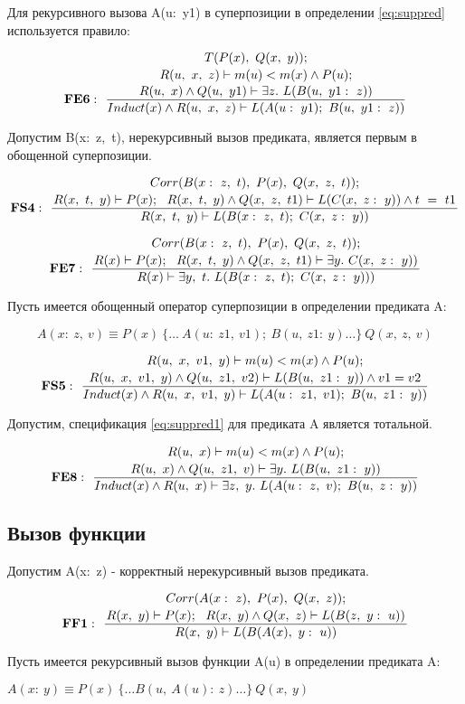 \documentclass[10pt,a4paper]{article}
\newcommand{\ruleI}[3] {
$$
\mathbf{#1:} ~~
\frac{#2}{#3}
$$
}
\newcommand{\ruleII}[4] {
\ruleI{#1}
{\genfrac{}{}{0pt}{0}{#2}{#3}}
{#4}
}
\newcommand{\ruleIII}[5] {
\ruleII{#1}
{\genfrac{}{}{0pt}{0}{#2}{#3}}
{#4}
{#5}
}
\newcommand{\numformula}[2] {
\begin{equation}
\label{eq:#1}
#2
\end{equation}
}
\newcommand{\lnkformula}[1] {
\eqref{eq:#1}
}
\begin{document}
Для рекурсивного вызова A(u: y1) в суперпозиции в определении \lnkformula{suppred} используется правило:

\ruleIII{FE6}
{T(P(x),~Q(x,~y));}
{R(u,~x,~z) \vdash m(u)<m(x) \land P(u);}
{R(u,~x) \land Q(u,~y1) \vdash \exists z.~L(B(u,~y1:~z))}
{Induct(x) \land R(u,~x,~z) \vdash L(A(u:~y1);~B(u,~y1:~z))}

Допустим B(x: z, t), нерекурсивный вызов предиката, является первым в обощенной суперпозиции.

\ruleII{FS4}
{Corr(B(x:~z,~t),~P(x),~Q(x,~z,~t));}
{R(x,~t,~y) \vdash P(x);~~R(x,~t,~y) \land Q(x,~z,~t1) \vdash L(C(x,~z:~y)) \land t = t1}
{R(x,~t,~y) \vdash L(B(x:~z,~t);~C(x,~z:~y))}

\ruleII{FE7}
{Corr(B(x:~z,~t),~P(x),~Q(x,~z,~t));}
{R(x) \vdash P(x);~~R(x,~t,~y) \land Q(x,~z,~t1) \vdash \exists y.~C(x,~z:~y))}
{R(x) \vdash \exists y,~t.~L(B(x:~z,~t);~C(x,~z:~y)))}

Пусть имеется обощенный оператор суперпозиции в определении предиката A:

\numformula{suppred1} {
A(x:~z,~v) \equiv P(x)~\{ \ldots ~ A(u:~z1,~v1);~B(u,~z1:~y) \ldots\}~Q(x,~z,~v)
}

\ruleII{FS5}
{R(u,~x,~v1,~y) \vdash m(u)<m(x) \land P(u);}
{R(u,~x,~v1,~y) \land Q(u,~z1,~v2) \vdash L(B(u,~z1:~y)) \land v1=v2}
{Induct(x) \land R(u,~x,~v1,~y) \vdash L(A(u:~z1,~v1);~B(u,~z1:~y))}

Допустим, спецификация \lnkformula{suppred1} для предиката A является тотальной.

\ruleII{FE8}
{R(u,~x) \vdash m(u)<m(x) \land P(u);}
{R(u,~x) \land Q(u,~z1,~v) \vdash \exists y.~L(B(u,~z1:~y))}
{Induct(x) \land R(u,~x) \vdash \exists z,~y.~L(A(u:~z,~v);~B(u,~z:~y))}

\subsection{Вызов функции}

Допустим A(x: z) - корректный нерекурсивный вызов предиката.

\ruleII{FF1}
{Corr(A(x:~z),~P(x),~Q(x,~z));}
{R(x,~y) \vdash P(x);~~R(x,~y) \land Q(x,~z) \vdash L(B(z,~y:~u))}
{R(x,~y) \vdash L(B(A(x),~y:~u))}

Пусть имеется рекурсивный вызов функции A(u) в определении предиката A:

\begin{center}
$ A(x:~y) \equiv P(x)~\{ \ldots B(u,~A(u):~z) \ldots \}~Q(x,~y) $
\end{center}
\end{document}
